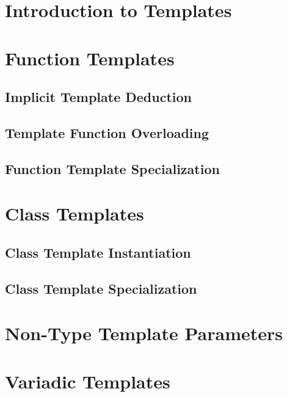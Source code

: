 \documentclass{article}
\title{\thistitle}
\author{\me}
\date{\today}
\begin{document}
\maketitle
\tableofcontents
\pagebreak

\section{Introduction to Templates}

\section{Function Templates}

\subsection{Implicit Template Deduction}

\subsection{Template Function Overloading}

\subsection{Function Template Specialization}

\section{Class Templates}

\subsection{Class Template Instantiation}

\subsection{Class Template Specialization}

\section{Non-Type Template Parameters}

\section{Variadic Templates}
\end{document}
